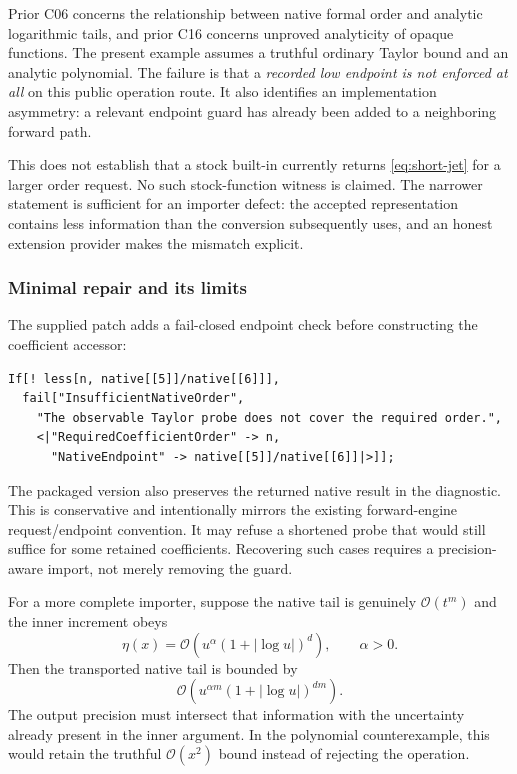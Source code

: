 \documentclass[11pt,letterpaper]{article}
\newcommand{\OO}{\mathcal O}
\begin{document}
Prior C06 concerns the relationship between native formal order and analytic logarithmic tails, and prior C16 concerns unproved analyticity of opaque functions. The present example assumes a truthful ordinary Taylor bound and an analytic polynomial. The failure is that a \emph{recorded low endpoint is not enforced at all} on this public operation route. It also identifies an implementation asymmetry: a relevant endpoint guard has already been added to a neighboring forward path.

This does not establish that a stock built-in currently returns \eqref{eq:short-jet} for a larger order request. No such stock-function witness is claimed. The narrower statement is sufficient for an importer defect: the accepted representation contains less information than the conversion subsequently uses, and an honest extension provider makes the mismatch explicit.

\subsubsection*{Minimal repair and its limits}

The supplied patch adds a fail-closed endpoint check before constructing the coefficient accessor:
\begin{lstlisting}
If[! less[n, native[[5]]/native[[6]]],
  fail["InsufficientNativeOrder",
    "The observable Taylor probe does not cover the required order.",
    <|"RequiredCoefficientOrder" -> n,
      "NativeEndpoint" -> native[[5]]/native[[6]]|>]];
\end{lstlisting}
The packaged version also preserves the returned native result in the diagnostic. This is conservative and intentionally mirrors the existing forward-engine request/endpoint convention. It may refuse a shortened probe that would still suffice for some retained coefficients. Recovering such cases requires a precision-aware import, not merely removing the guard.

For a more complete importer, suppose the native tail is genuinely $\OO(t^m)$ and the inner increment obeys
\[
 \eta(x)=\OO\!\left(u^\alpha(1+|\log u|)^d\right),\qquad \alpha>0.
\]
Then the transported native tail is bounded by
\begin{equation}\label{eq:tail-transport}
 \OO\!\left(u^{\alpha m}(1+|\log u|)^{dm}\right).
\end{equation}
The output precision must intersect that information with the uncertainty already present in the inner argument. In the polynomial counterexample, this would retain the truthful $\OO(x^2)$ bound instead of rejecting the operation.
\end{document}
